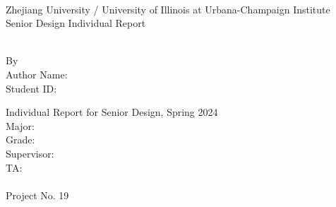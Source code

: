 \documentclass[../individual_thesis.tex]{subfiles}
\begin{document}
\begin{titlepage}
    \begin{center}
        ~~\\ %
        \vspace{1.5cm}
        {\fontsize{16}{24}\selectfont Zhejiang University / University of Illinois at Urbana-Champaign Institute}\\
        \vspace{1.88cm}
        {\fontsize{28}{42}\selectfont Senior Design Individual Report}\\
        \vspace{1.6cm}
        \begin{minipage}{15.92cm}
            \centering
            \fontsize{26}{26}\selectfont
            \MakeUppercase{\bf \RPTTITLE}
        \end{minipage}\\[2cm]
        {\fontsize{14}{21}\selectfont By}\\[1.5em]
        {\fontsize{14}{21}\selectfont Author Name: \AUTHORNAME}\\
        {\fontsize{14}{21}\selectfont Student ID: \STUDENTID}

        \vfill
        {\fontsize{12}{\baselineskip}\selectfont Individual Report for Senior Design, Spring 2024\\
            Major: \MAJOR \\
            Grade: \GRADE \\
            Supervisor: \FACULTYNAME \\
            TA:~ \TANAME\\
            \vfill}
        {\fontsize{12}{18}\selectfont\RPTDATE\\
            Project No. 19}
    \end{center}
    \vspace{2cm}
    ~
    \restoregeometry
\end{titlepage}
\thispagestyle{empty}
\end{document}
